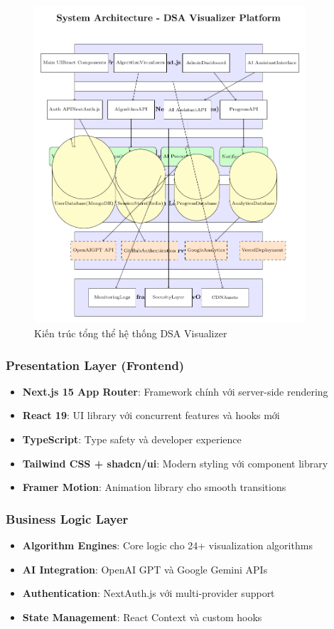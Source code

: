 \documentclass[12pt,a4paper]{article}
\begin{document}
\begin{figure}[H]
\centering
\includegraphics[width=0.9\textwidth]{diagrams/system_architecture.pdf}
\caption{Kiến trúc tổng thể hệ thống DSA Visualizer}
\label{fig:system_architecture}
\end{figure}

\subsubsection{Presentation Layer (Frontend)}
\begin{itemize}
    \item \textbf{Next.js 15 App Router}: Framework chính với server-side rendering
    \item \textbf{React 19}: UI library với concurrent features và hooks mới
    \item \textbf{TypeScript}: Type safety và developer experience
    \item \textbf{Tailwind CSS + shadcn/ui}: Modern styling với component library
    \item \textbf{Framer Motion}: Animation library cho smooth transitions
\end{itemize}

\subsubsection{Business Logic Layer}
\begin{itemize}
    \item \textbf{Algorithm Engines}: Core logic cho 24+ visualization algorithms
    \item \textbf{AI Integration}: OpenAI GPT và Google Gemini APIs
    \item \textbf{Authentication}: NextAuth.js với multi-provider support
    \item \textbf{State Management}: React Context và custom hooks
\end{itemize}
\end{document}
